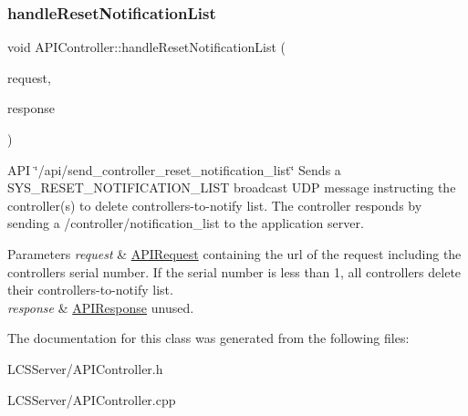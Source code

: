 \subsubsection{\texorpdfstring{handle\+Reset\+Notification\+List}{handleResetNotificationList}}
{\footnotesize\ttfamily void A\+P\+I\+Controller\+::handle\+Reset\+Notification\+List (\begin{DoxyParamCaption}\item[{const \hyperlink{class_a_p_i_request}{A\+P\+I\+Request} \&}]{request,  }\item[{\hyperlink{class_a_p_i_response}{A\+P\+I\+Response} $\ast$}]{response }\end{DoxyParamCaption})\hspace{0.3cm}{\ttfamily [slot]}}

A\+PI \char`\"{}/api/send\+\_\+controller\+\_\+reset\+\_\+notification\+\_\+list\char`\"{} Sends a S\+Y\+S\+\_\+\+R\+E\+S\+E\+T\+\_\+\+N\+O\+T\+I\+F\+I\+C\+A\+T\+I\+O\+N\+\_\+\+L\+I\+ST broadcast U\+DP message instructing the controller(s) to delete controllers-\/to-\/notify list. The controller responds by sending a /controller/notification\+\_\+list to the application server. 
\begin{DoxyParams}{Parameters}
{\em request} & \hyperlink{class_a_p_i_request}{A\+P\+I\+Request} containing the url of the request including the controller\textquotesingle{}s serial number. If the serial number is less than 1, all controllers delete their controllers-\/to-\/notify list. \\
\hline
{\em response} & \hyperlink{class_a_p_i_response}{A\+P\+I\+Response} unused. \\
\hline
\end{DoxyParams}


The documentation for this class was generated from the following files\+:\begin{DoxyCompactItemize}
\item 
L\+C\+S\+Server/A\+P\+I\+Controller.\+h\item 
L\+C\+S\+Server/A\+P\+I\+Controller.\+cpp\end{DoxyCompactItemize}
